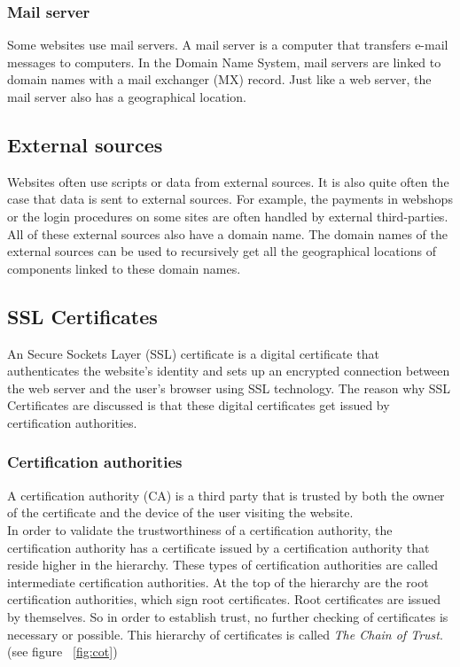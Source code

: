 \documentclass[twoside,openright,notitlepage]{uva-bachelor-thesis}
\begin{document}
\subsubsection{Mail server}
Some websites use mail servers. A mail server is a computer that transfers e-mail messages to computers. In the Domain Name System, mail servers are linked to domain names with a mail exchanger (MX) record. Just like a web server, the mail server also has a geographical location.

\subsection{External sources}
Websites often use scripts or data from external sources. It is also quite often the case that data is sent to external sources. For example, the payments in webshops or the login procedures on some sites are often handled by external third-parties. All of these external sources also have a domain name. The domain names of the external sources can be used to recursively get all the geographical locations of components linked to these domain names.

\subsection{SSL Certificates}
An Secure Sockets Layer (SSL) certificate is a digital certificate that authenticates the website's identity and sets up an encrypted connection between the web server and the user's browser using SSL technology. The reason why SSL Certificates are discussed is that these digital certificates get issued by certification authorities.

\subsubsection{Certification authorities}
A certification authority (CA) is a third party that is trusted by both the owner of the certificate and the device of the user visiting the website.\\

In order to validate the trustworthiness of a certification authority, the certification authority has a certificate issued by a certification authority that reside higher in the hierarchy. These types of certification authorities are called intermediate certification authorities. At the top of the hierarchy are the root certification authorities, which sign root certificates. Root certificates are issued by themselves. So in order to establish trust, no further checking of certificates is necessary or possible. This hierarchy of certificates is called \emph{The Chain of Trust}. (see figure ~\ref{fig:cot})\\
\end{document}
